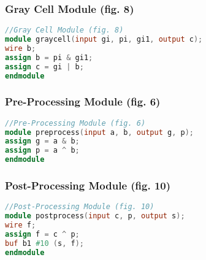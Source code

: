 \documentclass{IEEEtran}
\begin{document}
\subsubsection{Gray Cell Module (fig. 8)}
\begin{lstlisting}[language=Verilog]
//Gray Cell Module (fig. 8)
module graycell(input gi, pi, gi1, output c);
wire b;
assign b = pi & gi1;
assign c = gi | b;
endmodule
\end{lstlisting}

\subsubsection{Pre-Processing Module (fig. 6)}
\begin{lstlisting}[language=Verilog]
//Pre-Processing Module (fig. 6)
module preprocess(input a, b, output g, p);
assign g = a & b;
assign p = a ^ b;
endmodule
\end{lstlisting}

\subsubsection{Post-Processing Module (fig. 10)}
\begin{lstlisting}[language=Verilog]
//Post-Processing Module (fig. 10)
module postprocess(input c, p, output s);
wire f;
assign f = c ^ p;
buf b1 #10 (s, f);
endmodule
\end{lstlisting}
\end{document}
